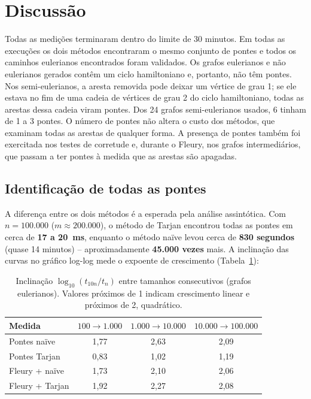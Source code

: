 \section{Discussão}

Todas as medições terminaram dentro do limite de 30 minutos. Em todas as execuções os dois métodos
encontraram o mesmo conjunto de pontes e todos os caminhos eulerianos encontrados foram validados.
Os grafos eulerianos e não eulerianos gerados contêm um ciclo hamiltoniano e, portanto, não têm pontes.
Nos semi-eulerianos, a aresta removida pode deixar um vértice de grau 1; se ele estava no fim de uma
cadeia de vértices de grau 2 do ciclo hamiltoniano, todas as arestas dessa cadeia viram pontes. Dos 24
grafos semi-eulerianos usados, 6 tinham de 1 a 3 pontes. O número de pontes não altera o
custo dos métodos, que examinam todas as arestas de qualquer forma. A presença de pontes também foi
exercitada nos testes de corretude e, durante o Fleury, nos grafos intermediários, que passam a ter
pontes à medida que as arestas são apagadas.

\subsection{Identificação de todas as pontes}

A diferença entre os dois métodos é a esperada pela análise assintótica. Com $n=100.000$ ($m\approx
200.000$), o método de Tarjan encontrou todas as pontes em cerca de \textbf{17 a 20~ms}, enquanto o
método naïve levou cerca de \textbf{830 segundos} (quase 14 minutos) -- aproximadamente
\textbf{45.000 vezes} mais. A inclinação das curvas no gráfico log-log mede o expoente de crescimento
(Tabela~\ref{tab:inclinacao}):

\begin{table}[H]
\centering
\small
\caption{Inclinação $\log_{10}(t_{10n}/t_n)$ entre tamanhos consecutivos (grafos eulerianos). Valores
próximos de 1 indicam crescimento linear e próximos de 2, quadrático.}
\label{tab:inclinacao}
\begin{tabular}{lccc}
\toprule
Medida & $100\to1.000$ & $1.000\to10.000$ & $10.000\to100.000$ \\
\midrule
Pontes naïve   & 1,77 & 2,63 & 2,09 \\
Pontes Tarjan  & 0,83 & 1,02 & 1,19 \\
Fleury + naïve & 1,73 & 2,10 & 2,06 \\
Fleury + Tarjan& 1,92 & 2,27 & 2,08 \\
\bottomrule
\end{tabular}
\end{table}

